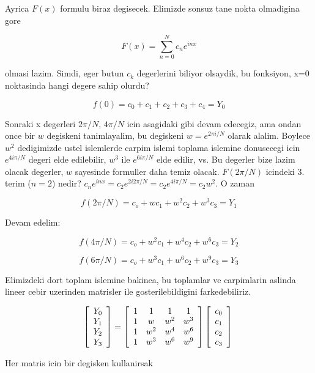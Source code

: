\documentclass[12pt,fleqn]{article}\usepackage{../common}
\begin{document}
Ayrica $F(x)$ formulu biraz degisecek. Elimizde sonsuz tane nokta olmadigina gore

$$ F(x) = \sum_{n=0}^{N} c_ne^{inx} $$

olmasi lazim. Simdi, eger butun $c_k$ degerlerini biliyor olsaydik, bu
fonksiyon, x=0 noktasinda hangi degere sahip olurdu?

$$ f(0) = c_0 + c_1 + c_2 + c_3 + c_4 = Y_0 $$

Sonraki x degerleri $2\pi/N$, $4\pi/N$ icin asagidaki gibi devam edecegiz, ama
ondan once bir $w$ degiskeni tanimlayalim, bu degiskeni $w=e^{2\pi i/N}$ olarak
alalim. Boylece $w^2$ dedigimizde ustel islemlerde carpim islemi toplama
islemine donusecegi icin $e^{4i\pi/N}$ degeri elde edilebilir, $w^3$ ile
$e^{6i\pi/N}$ elde edilir, vs. Bu degerler bize lazim olacak degerler, $w$
sayesinde formuller daha temiz olacak. $F(2\pi/N)$ icindeki 3. terim ($n=2$)
nedir?  $c_ne^{inx} = c_2e^{2i2\pi/N} = c_2e^{4i\pi/N} = c_2w^2$. O zaman

$$ f(2\pi/N) = c_o + wc_1 + w^2c_2 + w^3c_3 = Y_1 $$

Devam edelim:

$$ f(4\pi/N) = c_o + w^2c_1 + w^4c_2 + w^6c_3 = Y_2  $$

$$ f(6\pi/N) = c_o + w^3c_1 + w^6c_2 + w^9c_3 = Y_3  $$

Elimizdeki dort toplam islemine bakinca, bu toplamlar ve carpimlarin aslinda
lineer cebir uzerinden matrisler ile gosterilebildigini farkedebiliriz. 

$$  
\left[ \begin{array}{c}
    Y_0 \\
    Y_1 \\
    Y_2 \\
    Y_3
\end{array} \right]
=
\left[ \begin{array}{cccc}
    1 & 1 & 1 & 1 \\
    1 & w & w^2 & w^3  \\
    1 & w^2 & w^4 & w^6  \\
    1 & w^3 & w^6 & w^9  
\end{array} \right]
\left[ \begin{array}{c}
    c_0 \\
    c_1 \\
    c_2 \\
    c_3
\end{array} \right] \\
$$

Her matris icin bir degisken kullanirsak
\end{document}
